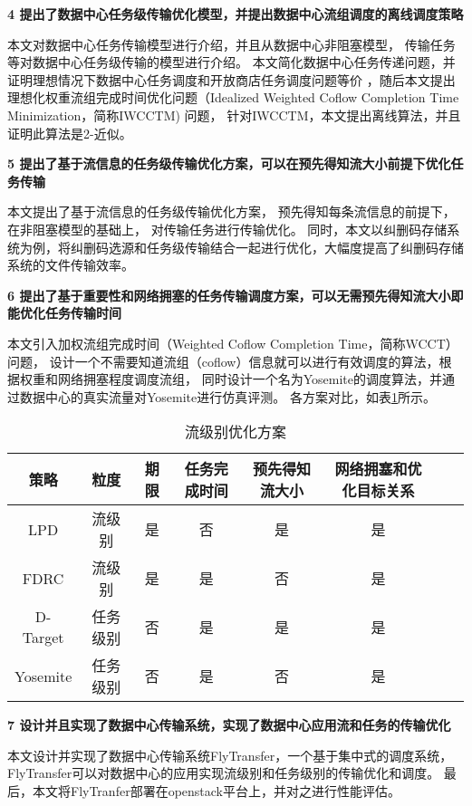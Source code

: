 \textbf{4 提出了数据中心任务级传输优化模型，并提出数据中心流组调度的离线调度策略}

本文对数据中心任务传输模型进行介绍，并且从数据中心非阻塞模型，
传输任务等对数据中心任务级传输的模型进行介绍。
本文简化数据中心任务传递问题，并证明理想情况下数据中心任务调度和开放商店任务调度问题等价
，随后本文提出理想化权重流组完成时间优化问题（Idealized Weighted Coflow Completion Time Minimization，简称IWCCTM) 问题，
针对IWCCTM，本文提出离线算法，并且证明此算法是2-近似。

\textbf{5 提出了基于流信息的任务级传输优化方案，可以在预先得知流大小前提下优化任务传输}

本文提出了基于流信息的任务级传输优化方案，
预先得知每条流信息的前提下，在非阻塞模型的基础上，
对传输任务进行传输优化。 
同时，本文以纠删码存储系统为例，将纠删码选源和任务级传输结合一起进行优化，大幅度提高了纠删码存储系统的文件传输效率。


\textbf{6 提出了基于重要性和网络拥塞的任务传输调度方案，可以无需预先得知流大小即能优化任务传输时间}


本文引入加权流组完成时间（Weighted Coflow Completion Time，简称WCCT）问题，
设计一个不需要知道流组（coflow）信息就可以进行有效调度的算法，根据权重和网络拥塞程度调度流组，
同时设计一个名为Yosemite的调度算法，并通过数据中心的真实流量对Yosemite进行仿真评测。
各方案对比，如表\ref{compare}所示。

\begin{table}[h]
\centering
\caption{流级别优化方案}\label{compare}
\renewcommand{\arraystretch}{1.5}
\begin{tabular}{|c|c|c|c|c|c|c|c|} \hline
\setlength{\tabcolsep}{10pt}
策略& 粒度 &期限&任务完成时间&预先得知流大小&网络拥塞和优化目标关系\\ \hline
LPD &流级别&是&否&是& 是\\ \hline
FDRC &流级别&是&是&否& 是\\ \hline
D-Target &任务级别&否&是&是& 是\\ \hline
Yosemite &任务级别&否&是&否& 是\\ \hline
\end{tabular}
\end{table}






\textbf{7 设计并且实现了数据中心传输系统，实现了数据中心应用流和任务的传输优化}


本文设计并实现了数据中心传输系统FlyTransfer，一个基于集中式的调度系统，
FlyTransfer可以对数据中心的应用实现流级别和任务级别的传输优化和调度。
最后，本文将FlyTranfer部署在openstack平台上，并对之进行性能评估。


